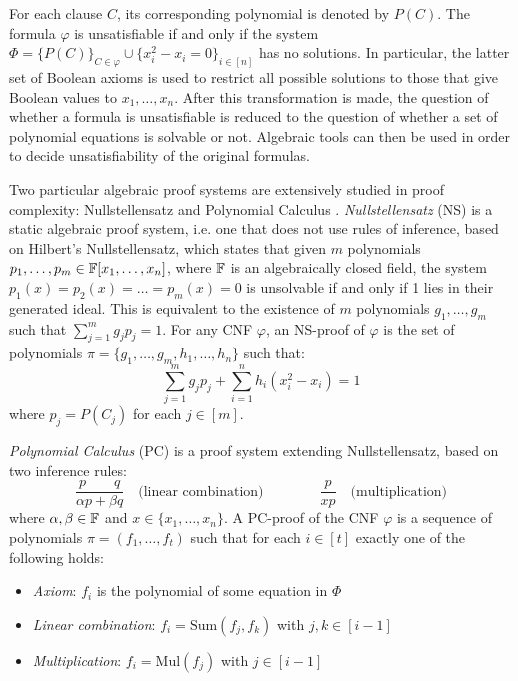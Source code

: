 For each clause $C$, its corresponding polynomial is denoted by $P(C)$. The formula $\varphi$ is unsatisfiable if and only if the system $\Phi = \{P(C)\}_{C \in \varphi} \cup \{x_i^2 - x_i = 0\}_{i \in [n]}$ has no solutions. In particular, the latter set of Boolean axioms is used to restrict all possible solutions to those that give Boolean values to $x_1, \ldots, x_n$. After this transformation is made, the question of whether a formula is unsatisfiable is reduced to the question of whether a set of polynomial equations is solvable or not. Algebraic tools can then be used in order to decide unsatisfiability of the original formulas.

Two particular algebraic proof systems are extensively studied in proof complexity: Nullstellensatz and Polynomial Calculus \cite{nullstellensatz,separation_pc_ns}. \textit{Nullstellensatz} (NS) is a static algebraic proof system, i.e. one that does not use rules of inference, based on Hilbert's Nullstellensatz, which states that given $m$ polynomials $p_1, \ldots, p_m \in \mathbb{F}[x_1, \ldots, x_n]$, where $\mathbb{F}$ is an algebraically closed field, the system $p_1(x) = p_2(x) = \ldots = p_m(x) = 0$ is unsolvable if and only if 1 lies in their generated ideal. This is equivalent to the existence of $m$ polynomials $g_1, \ldots , g_m$ such that $\sum_{j = 1}^m g_jp_j = 1$. For any CNF $\varphi$, an NS-proof of $\varphi$ is the set of polynomials $\pi = \{g_1, \ldots, g_m, h_1, \ldots, h_n\}$ such that:
\begin{equation}
    \sum_{j = 1}^m g_jp_j + \sum_{i = 1}^n h_i(x_i^2-x_i) = 1
\end{equation}
where $p_j = P(C_j)$ for each $j \in [m]$.

\textit{Polynomial Calculus} (PC) is a proof system extending Nullstellensatz, based on two inference rules:
\[\dfrac{p \qquad q}{\alpha p+ \beta q} \quad \text{(linear combination)} \qquad\qquad \dfrac{p}{xp} \quad \text{(multiplication)}\]
where $\alpha,\beta \in \mathbb{F}$ and $x \in \{x_1, \ldots, x_n\}$. A PC-proof of the CNF $\varphi$ is a sequence of polynomials $\pi = (f_1, \ldots, f_t)$ such that for each $i \in [t]$ exactly one of the following holds:
\begin{itemize}
    \item \textit{Axiom}: $f_i$ is the polynomial of some equation in $\Phi$
    \item \textit{Linear combination}: $f_i = \mathrm{Sum}(f_j, f_k)$ with $j,k \in [i-1]$
    \item \textit{Multiplication}: $f_i = \mathrm{Mul}(f_j)$ with $j \in [i-1]$
\end{itemize}

